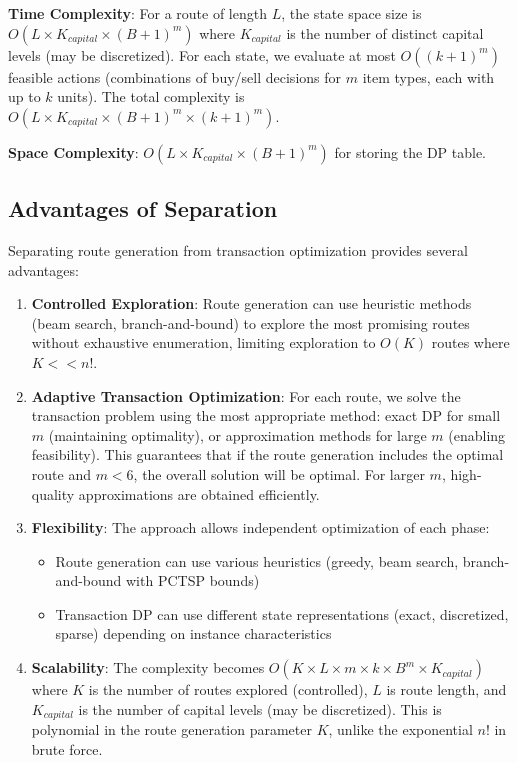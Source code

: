 \documentclass[12pt]{article}
\begin{document}
\textbf{Time Complexity}: For a route of length $L$, the state space size is $O(L \times K_{capital} \times (B+1)^m)$ where $K_{capital}$ is the number of distinct capital levels (may be discretized). For each state, we evaluate at most $O((k+1)^m)$ feasible actions (combinations of buy/sell decisions for $m$ item types, each with up to $k$ units). The total complexity is $O(L \times K_{capital} \times (B+1)^m \times (k+1)^m)$.

\textbf{Space Complexity}: $O(L \times K_{capital} \times (B+1)^m)$ for storing the DP table.

\subsection{Advantages of Separation}

Separating route generation from transaction optimization provides several advantages:

\begin{enumerate}
    \item \textbf{Controlled Exploration}: Route generation can use heuristic methods (beam search, branch-and-bound) to explore the most promising routes without exhaustive enumeration, limiting exploration to $O(K)$ routes where $K << n!$.
    
    \item \textbf{Adaptive Transaction Optimization}: For each route, we solve the transaction problem using the most appropriate method: exact DP for small $m$ (maintaining optimality), or approximation methods for large $m$ (enabling feasibility). This guarantees that if the route generation includes the optimal route and $m < 6$, the overall solution will be optimal. For larger $m$, high-quality approximations are obtained efficiently.
    
    \item \textbf{Flexibility}: The approach allows independent optimization of each phase:
    \begin{itemize}
        \item Route generation can use various heuristics (greedy, beam search, branch-and-bound with PCTSP bounds)
        \item Transaction DP can use different state representations (exact, discretized, sparse) depending on instance characteristics
    \end{itemize}
    
    \item \textbf{Scalability}: The complexity becomes $O(K \times L \times m \times k \times B^m \times K_{capital})$ where $K$ is the number of routes explored (controlled), $L$ is route length, and $K_{capital}$ is the number of capital levels (may be discretized). This is polynomial in the route generation parameter $K$, unlike the exponential $n!$ in brute force.
\end{enumerate}
\end{document}
